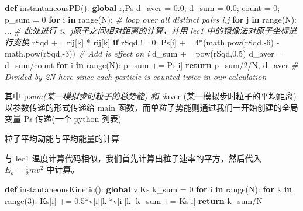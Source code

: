 \documentclass[
]{article}
\newenvironment{Shaded}{}{}
\newcommand{\BuiltInTok}[1]{#1}
\newcommand{\CommentTok}[1]{\textcolor[rgb]{0.38,0.63,0.69}{\textit{#1}}}
\newcommand{\ControlFlowTok}[1]{\textcolor[rgb]{0.00,0.44,0.13}{\textbf{#1}}}
\newcommand{\DecValTok}[1]{\textcolor[rgb]{0.25,0.63,0.44}{#1}}
\newcommand{\FloatTok}[1]{\textcolor[rgb]{0.25,0.63,0.44}{#1}}
\newcommand{\KeywordTok}[1]{\textcolor[rgb]{0.00,0.44,0.13}{\textbf{#1}}}
\newcommand{\NormalTok}[1]{#1}
\newcommand{\OperatorTok}[1]{\textcolor[rgb]{0.40,0.40,0.40}{#1}}
\begin{document}
\begin{Shaded}
\begin{Highlighting}[]
\KeywordTok{def}\NormalTok{ instantaneousPD():}
    \KeywordTok{global}\NormalTok{ r,Ps}
\NormalTok{	d\_aver }\OperatorTok{=} \FloatTok{0.0}\OperatorTok{;}\NormalTok{ d\_sum }\OperatorTok{=} \FloatTok{0.0}\OperatorTok{;}\NormalTok{ count }\OperatorTok{=} \DecValTok{0}\OperatorTok{;}\NormalTok{ p\_sum }\OperatorTok{=} \DecValTok{0}
	\ControlFlowTok{for}\NormalTok{ i }\KeywordTok{in} \BuiltInTok{range}\NormalTok{(N):  }\CommentTok{\# loop over all distinct pairs i,j}
		\ControlFlowTok{for}\NormalTok{ j }\KeywordTok{in} \BuiltInTok{range}\NormalTok{(N):}
\NormalTok{... }\CommentTok{\# 此处进行 i、j原子之间相对距离的计算，并用 lec1 中的镜像法对原子坐标进行变换}
\NormalTok{			rSqd }\OperatorTok{+=}\NormalTok{ rij[k] }\OperatorTok{*}\NormalTok{ rij[k]}
			\ControlFlowTok{if}\NormalTok{ rSqd }\OperatorTok{!=} \DecValTok{0}\NormalTok{:}
\NormalTok{				Ps[i] }\OperatorTok{+=} \DecValTok{4}\OperatorTok{*}\NormalTok{(math.}\BuiltInTok{pow}\NormalTok{(rSqd,}\OperatorTok{{-}}\DecValTok{6}\NormalTok{) }\OperatorTok{{-}}\NormalTok{ math.}\BuiltInTok{pow}\NormalTok{(rSqd,}\OperatorTok{{-}}\DecValTok{3}\NormalTok{)) }\CommentTok{\# Add j\textquotesingle{}s effect on i}
\NormalTok{			d\_sum }\OperatorTok{+=} \BuiltInTok{pow}\NormalTok{(rSqd,}\FloatTok{0.5}\NormalTok{)}
\NormalTok{	d\_aver }\OperatorTok{=}\NormalTok{ d\_sum}\OperatorTok{/}\NormalTok{count}
	\ControlFlowTok{for}\NormalTok{ i }\KeywordTok{in} \BuiltInTok{range}\NormalTok{(N):}
\NormalTok{		p\_sum }\OperatorTok{+=}\NormalTok{ Ps[i]}
	\ControlFlowTok{return}\NormalTok{ p\_sum}\OperatorTok{/}\DecValTok{2}\OperatorTok{/}\NormalTok{N, d\_aver  }\CommentTok{\# Divided by 2N here since each particle is counted twice in our calculation}
\end{Highlighting}
\end{Shaded}

其中 p\emph{sum(某一模拟步时粒子的总势能) 和 d}aver
(某一模拟步时粒子的平均距离) 以参数传递的形式传递给 main
函数，而单粒子势能则通过我们一开始创建的全局变量 Ps 传递(一个 python
列表)

粒子平均动能与平均能量的计算

与 lec1
温度计算代码相似，我们首先计算出粒子速率的平方，然后代入\(E_k=\frac{1}{2}mv^2\)
中计算。

\begin{Shaded}
\begin{Highlighting}[]
\KeywordTok{def}\NormalTok{ instantaneousKinetic():}
	\KeywordTok{global}\NormalTok{ v,Ks}
\NormalTok{	k\_sum }\OperatorTok{=} \DecValTok{0}
	\ControlFlowTok{for}\NormalTok{ i }\KeywordTok{in} \BuiltInTok{range}\NormalTok{(N):}
		\ControlFlowTok{for}\NormalTok{ k }\KeywordTok{in} \BuiltInTok{range}\NormalTok{(}\DecValTok{3}\NormalTok{):}
\NormalTok{			Ks[i] }\OperatorTok{+=} \FloatTok{0.5}\OperatorTok{*}\NormalTok{v[i][k]}\OperatorTok{*}\NormalTok{v[i][k]}
\NormalTok{			k\_sum }\OperatorTok{+=}\NormalTok{ Ks[i]}
	\ControlFlowTok{return}\NormalTok{ k\_sum}\OperatorTok{/}\NormalTok{N}
\end{Highlighting}
\end{Shaded}
\end{document}
